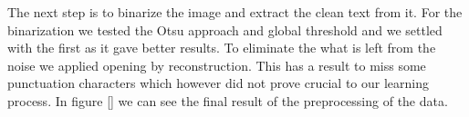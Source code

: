 The next step is to binarize the image and extract the clean text from it. For the binarization we tested the Otsu approach and global threshold and we settled with the first as it gave better results. To eliminate the what is left from the noise we applied opening by reconstruction. This has a result to miss some punctuation characters which however did not prove crucial to our learning process. In figure \ref{} we can see the final result of the preprocessing of the data. 